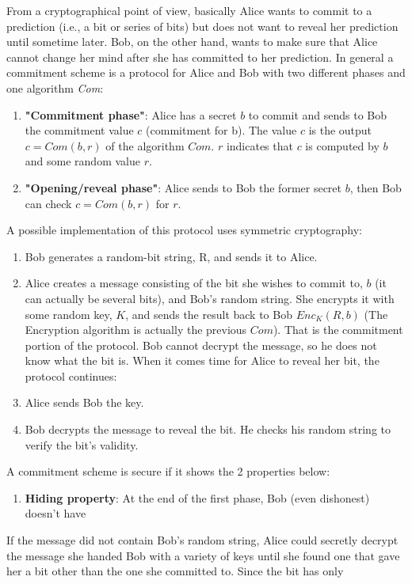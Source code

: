 \documentclass{article}
\begin{document}
From a cryptographical point of view, basically Alice wants to commit to a prediction (i.e., a bit or series of bits) but does not
want to reveal her prediction until sometime later. Bob, on the other hand, wants to make sure that Alice cannot change her mind after she has committed to her prediction.
In general a commitment scheme is a protocol for Alice and Bob with two different phases and one algorithm \textit{Com}:
\begin{enumerate}
\item \textbf{"Commitment phase"}: Alice has a secret $b$ to commit and sends to Bob the commitment value $c$ (commitment for b). The value $c$ is the output $c=Com(b, r)$ of the algorithm $Com$. $r$ indicates that $c$ is computed by $b$ and some random value $r$.
\item \textbf{"Opening/reveal phase"}: Alice sends to Bob the former secret $b$, then Bob can check $c=Com(b,r)$ for $r$.
\end{enumerate}
A possible implementation of this protocol uses symmetric cryptography:
\begin{enumerate}
    \item Bob generates a random-bit string, R, and sends it to Alice.
    \item Alice creates a message consisting of the bit she wishes to commit to, $b$ (it can actually be several bits), and Bob’s random string. She encrypts it with some random key, $K$, and sends the result back to Bob \rightarrow $Enc_K(R,b)$ (The Encryption algorithm is actually the previous $Com$). That is the commitment portion of the protocol. Bob cannot decrypt the
message, so he does not know what the bit is.
When it comes time for Alice to reveal her bit, the protocol continues:
\item Alice sends Bob the key.
\item Bob decrypts the message to reveal the bit. He checks his random
string to verify the bit’s validity.
\end{enumerate}
A commitment scheme is secure if it shows the 2 properties below:
\begin{enumerate}
    \item \textbf{Hiding property}: At the end of the first phase, Bob (even dishonest) doesn't have 
\end{enumerate}
If the message did not contain Bob’s random string, Alice could secretly
decrypt the message she handed Bob with a variety of keys until she found one
that gave her a bit other than the one she committed to. Since the bit has only
\end{document}
